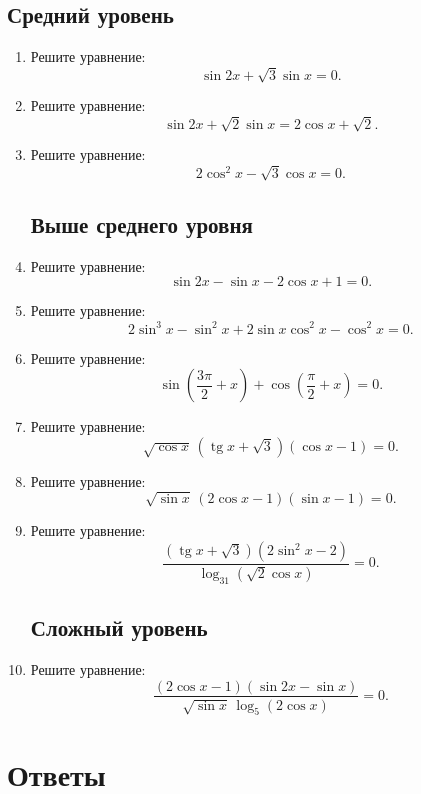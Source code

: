 \documentclass[a4paper,12pt]{article}
\providecommand{\tg}{\mathop{\mathrm{tg}}\nolimits}
\begin{document}
\subsection*{Средний уровень}

\begin{enumerate}
  \item Решите уравнение:
  \[
  \sin2x+\sqrt3\sin x=0.
  \]

  \item Решите уравнение:
  \[
  \sin2x+\sqrt2\sin x=2\cos x+\sqrt2.
  \]

  \item Решите уравнение:
  \[
  2\cos^2x-\sqrt3\cos x=0.
  \]

\subsection*{Выше среднего уровня}

  \item Решите уравнение:
  \[
  \sin2x-\sin x-2\cos x+1=0.
  \]

  \item Решите уравнение:
  \[
  2\sin^3x-\sin^2x+2\sin x\cos^2x-\cos^2x=0.
  \]

  \item Решите уравнение:
  \[
  \sin\left(\frac{3\pi}{2}+x\right)+\cos\left(\frac{\pi}{2}+x\right)=0.
  \]

  \item Решите уравнение:
  \[
  \sqrt{\cos x}\,(\tg x+\sqrt3)(\cos x-1)=0.
  \]

  \item Решите уравнение:
  \[
  \sqrt{\sin x}\,(2\cos x-1)(\sin x-1)=0.
  \]

  \item Решите уравнение:
  \[
  \frac{(\tg x+\sqrt3)(2\sin^2x-2)}
  {\log_{31}(\sqrt2\cos x)}=0.
  \]

\subsection*{Сложный уровень}

  \item Решите уравнение:
  \[
  \frac{(2\cos x-1)(\sin2x-\sin x)}
  {\sqrt{\sin x}\,\log_{5}(2\cos x)}=0.
  \]
\end{enumerate}

\newpage

\section*{Ответы}
\end{document}
